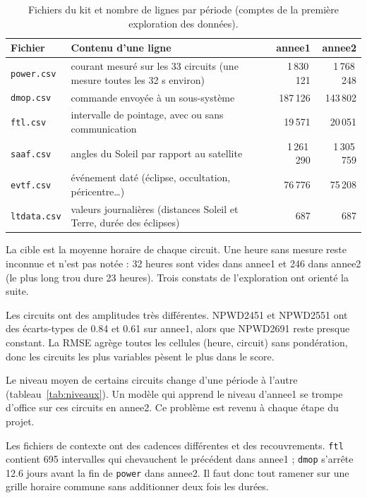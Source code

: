 \documentclass[11pt,a4paper]{article}
\newcommand{\code}[1]{\texttt{#1}}
\begin{document}
\begin{table}[!htb]
\centering\small
\caption{Fichiers du kit et nombre de lignes par période (comptes de la première exploration des données).}
\label{tab:fichiers}
\begin{tabularx}{\linewidth}{l X r r}
\toprule
Fichier & Contenu d'une ligne & annee1 & annee2 \\
\midrule
\code{power.csv}  & courant mesuré sur les 33 circuits (une mesure toutes les 32 s environ) & 1\,830\,121 & 1\,768\,248 \\
\code{dmop.csv}   & commande envoyée à un sous-système & 187\,126 & 143\,802 \\
\code{ftl.csv}    & intervalle de pointage, avec ou sans communication & 19\,571 & 20\,051 \\
\code{saaf.csv}   & angles du Soleil par rapport au satellite & 1\,261\,290 & 1\,305\,759 \\
\code{evtf.csv}   & événement daté (éclipse, occultation, péricentre\ldots) & 76\,776 & 75\,208 \\
\code{ltdata.csv} & valeurs journalières (distances Soleil et Terre, durée des éclipses) & 687 & 687 \\
\bottomrule
\end{tabularx}
\end{table}

La cible est la moyenne horaire de chaque circuit. Une heure sans mesure reste inconnue et n'est pas notée : 32 heures sont vides dans annee1 et 246 dans annee2 (le plus long trou dure 23 heures). Trois constats de l'exploration ont orienté la suite.

Les circuits ont des amplitudes très différentes. NPWD2451 et NPWD2551 ont des écarts-types de 0.84 et 0.61 sur annee1, alors que NPWD2691 reste presque constant. La RMSE agrège toutes les cellules (heure, circuit) sans pondération, donc les circuits les plus variables pèsent le plus dans le score.

Le niveau moyen de certains circuits change d'une période à l'autre (tableau~\ref{tab:niveaux}). Un modèle qui apprend le niveau d'annee1 se trompe d'office sur ces circuits en annee2. Ce problème est revenu à chaque étape du projet.

Les fichiers de contexte ont des cadences différentes et des recouvrements. \code{ftl} contient 695 intervalles qui chevauchent le précédent dans annee1 ; \code{dmop} s'arrête 12.6 jours avant la fin de \code{power} dans annee2. Il faut donc tout ramener sur une grille horaire commune sans additionner deux fois les durées.
\end{document}
